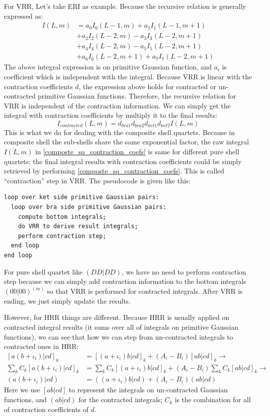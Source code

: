For VRR, Let's take ERI as example. Because the recursive relation 
is generally expressed as: 
\begin{align}
I(L,m) &= a_{0}I_{0}(L-1,m) + a_{1}I_{1}(L-1,m+1) \nonumber \\ 
&+ a_{2}I_{2}(L-2,m) - a_{3}I_{3}(L-2,m+1) \nonumber \\
&+ a_{4}I_{4}(L-2,m) - a_{5}I_{5}(L-2,m+1) \nonumber \\
&+ a_{6}I_{6}(L-2,m+1) + a_{7}I_{7}(L-2,m+1)
\end{align}
The above integral expression is on primitive Gaussian function, and 
$a_{i}$ is coefficient which is independent with the integral.
Because VRR is linear with the contraction coefficients $d$,
the expression above holds for contracted or un-contracted primitive
Gaussian functions. Therefore, the recursive relation for VRR is 
independent of the contraction information. We can simply get the 
integral with contraction coefficients by multiply it to the final
results:
\begin{equation}\label{composte_sq_contraction_coefs}
 I_{contracted}(L,m) = d_{bra1}d_{bra2}d_{ket1}d_{ket2}I(L,m)
\end{equation}
This is what we do for dealing with the composite shell quartets.
Because in composite shell the sub-shells share the same exponential
factor, the raw integral $I(L,m)$ in \ref{composte_sq_contraction_coefs} 
is same for different pure shell quartets; the final integral results
with contraction coefficients could be simply retrieved by performing 
\ref{composte_sq_contraction_coefs}. This is called ``contraction'' step
in VRR. The pseudocode is given like this:
\begin{verbatim}
loop over ket side primitive Gaussian pairs:
  loop over bra side primitive Gaussian pairs:
    compute bottom integrals;
    do VRR to derive result integrals;
    perform contraction step; 
  end loop
end loop
\end{verbatim}
For pure shell quartet like $(DD|DD)$, we have no need to perform 
contraction step because we can simply add contraction information
to the bottom integrals $(00|00)^{(m)}$ so that VRR is performed 
for contracted integrals. After VRR is ending, we just simply update
the results.

However, for HRR things are different. Because HRR is usually applied on
contracted integral results (it sums over all of integrals on 
primitive Gaussian functions), we can see that how we can step from
un-contracted integrals to contracted ones in HRR:
\begin{align}\label{composite_sq_hrr}
 [a(b+\iota_{i})|cd]_{k} &= [(a+\iota_{i})b|cd]_{k} + 
(A_{i} - B_{i})[ab|cd]_{k} \rightarrow \nonumber \\
\sum_{k}C_{k}[a(b+\iota_{i})|cd]_{k} &= \sum_{k}C_{k}[(a+\iota_{i})b|cd]_{k} + 
(A_{i} - B_{i})\sum_{k}C_{k}[ab|cd]_{k} \rightarrow \nonumber \\
(a(b+\iota_{i})|cd) &= ((a+\iota_{i})b|cd) + 
(A_{i} - B_{i})(ab|cd)
\end{align}
Here we use $[ab|cd]$ to represent the integrals on un-contracted Gaussian 
functions, and $(ab|cd)$ for the contracted integrals; $C_{k}$ is the 
combination for all of contraction coefficients of $d$.

